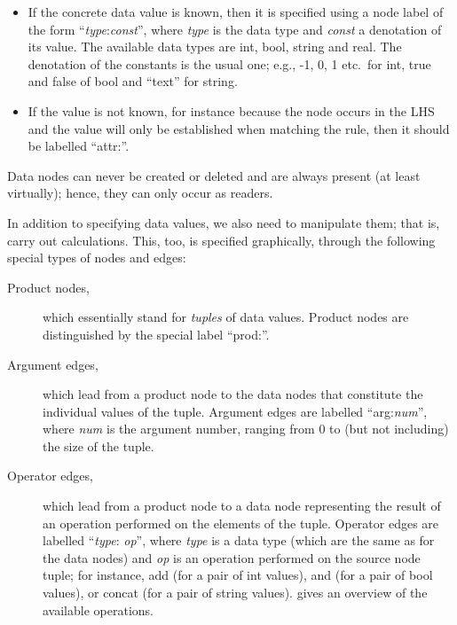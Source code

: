 \begin{itemize}
\item If the concrete data value is known, then it is specified using a node
  label of the form ``\textsf{{\itshape type}:{\itshape const}}'', where
  \textsf{\itshape type} is the data type and \textsf{\itshape const} a
  denotation of its value. The available data types are \textsf{int},
  \textsf{bool}, \textsf{string} and \textsf{real}. The denotation of the
  constants is the usual one; e.g., \textsf{-1}, \textsf{0}, \textsf{1} etc.\
  for \textsf{int}, \textsf{true} and \textsf{false} of \textsf{bool} and
  \textsf{``text''} for \textsf{string}.

\item If the value is not known, for instance because the node occurs in the
  LHS and the value will only be established when matching the rule, then it
  should be labelled ``\textsf{attr:}''.
\end{itemize}
%
Data nodes can never be created or deleted and are always present (at least
virtually); hence, they can only occur as readers.

\medskip\noindent
In addition to specifying data values, we also need to manipulate them; that
is, carry out calculations. This, too, is specified graphically, through
the following special types of nodes and edges:
%
\begin{description}
\item[Product nodes,] which essentially stand for \emph{tuples} of data
  values. Product nodes are distinguished by the special label
  ``\textsf{prod:}''.

\item[Argument edges,] which lead from a product node to the data nodes that
  constitute the individual values of the tuple. Argument edges are labelled
  ``\textsf{arg:{\itshape num}}'', where \textsf{\itshape num} is the argument
  number, ranging from \textsf{0} to (but not including) the size of the tuple.

\item[Operator edges,] which lead from a product node to a data node
  representing the result of an operation performed on the elements of the
  tuple. Operator edges are labelled ``\textsf{{\itshape type}:{\itshape
  op}}'', where \textsf{\itshape type} is a data type (which are the same as
  for the data nodes) and \textsf{\itshape op} is an operation performed on the
  source node tuple; for instance, \textsf{add} (for a pair of \textsf{int}
  values), \textsf{and} (for a pair of \textsf{bool} values), or
  \textsf{concat} (for a pair of \textsf{string} values).  gives an
  overview of the available operations.
\end{description}

